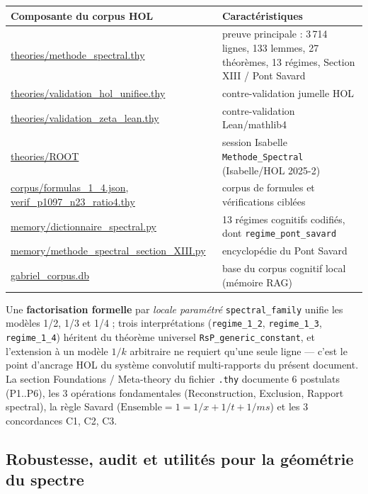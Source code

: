 \documentclass[11pt,a4paper]{article}
\begin{document}
\begin{center}\small
\begin{tabular}{@{}p{} p{}@{}}
\toprule
\rowcolor{spectralgris}
Composante du corpus HOL & Caractéristiques \\
\midrule
\url{theories/methode_spectral.thy} & preuve principale : 3\,714 lignes, 133 lemmes, 27 théorèmes, 13 régimes, Section XIII / Pont Savard \\
\url{theories/validation_hol_unifiee.thy} & contre-validation jumelle HOL \\
\url{theories/validation_zeta_lean.thy} & contre-validation Lean/mathlib4 \\
\url{theories/ROOT} & session Isabelle \texttt{Methode\_Spectral} (Isabelle/HOL 2025-2) \\
\url{corpus/formulas_1_4.json}, \url{verif_p1097_n23_ratio4.thy} & corpus de formules et vérifications ciblées \\
\url{memory/dictionnaire_spectral.py} & 13 régimes cognitifs codifiés, dont \texttt{regime\_pont\_savard} \\
\url{memory/methode_spectral_section_XIII.py} & encyclopédie du Pont Savard \\
\url{gabriel_corpus.db} & base du corpus cognitif local (mémoire RAG) \\
\bottomrule
\end{tabular}
\end{center}

Une \textbf{factorisation formelle} par \emph{locale paramétré}
\texttt{spectral\_family} unifie les modèles 1/2, 1/3 et 1/4 ; trois
interprétations (\texttt{regime\_1\_2}, \texttt{regime\_1\_3},
\texttt{regime\_1\_4}) héritent du théorème universel
\texttt{RsP\_generic\_constant}, et l'extension à un modèle $1/k$ arbitraire ne
requiert qu'une seule ligne --- c'est le point d'ancrage HOL du système
convolutif multi-rapports du présent document. La section \og Foundations /
Meta-theory \fg{} du fichier \texttt{.thy} documente 6 postulats (P1..P6), les
3 opérations fondamentales (Reconstruction, Exclusion, Rapport spectral), la
règle Savard ($\text{Ensemble} = 1 = 1/x + 1/t + 1/ms$) et les 3 concordances
C1, C2, C3.

\subsection{Robustesse, audit et utilités pour la géométrie du spectre}
\end{document}
